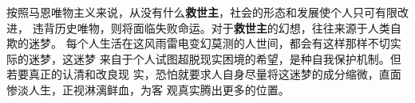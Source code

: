 按照马恩唯物主义来说，从没有什么\textbf{救世主}，社会的形态和发展使个人只可有限改进，
违背历史唯物，则将面临失败命运。对于\textbf{救世主}的幻想，往往来源于人类自欺的迷梦。
每个人生活在这风雨雷电变幻莫测的人世间，都会有这样那样不切实际的迷梦，这迷梦
来自于个人试图超脱现实困境的希望，是种自我保护机制。但若要真正的认清和改良现
实，恐怕就要求人自身尽量将这迷梦的成分缩微，直面惨淡人生，正视淋漓鲜血，为客
观真实腾出更多的位置。







